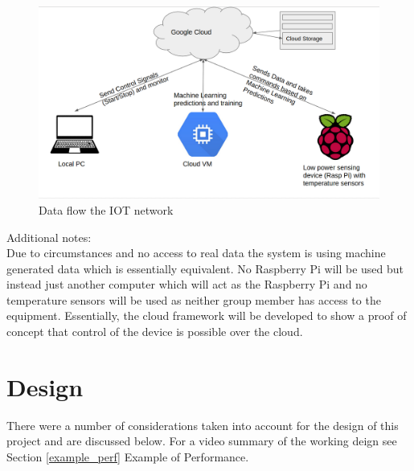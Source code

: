 \documentclass{article}
\begin{document}
\begin{figure}
    \centering
    \includegraphics[width=.9\textwidth]{cloud.png}
    \caption{Data flow the IOT network}
\end{figure}
\newline

Additional notes:\\
Due to circumstances and no access to real data the system is using machine generated data which is essentially equivalent. No Raspberry Pi will be used but instead just another computer which will act as the Raspberry Pi and no temperature sensors will be used as neither group member has access to the equipment. Essentially, the cloud framework will be developed to show a proof of concept that control of the device is possible over the cloud. 
\newpage
\section{Design}
There were a number of considerations taken into account for the design of this project and are discussed below. For a video summary of the working deign see Section \ref{example_perf} Example of Performance.
\end{document}
